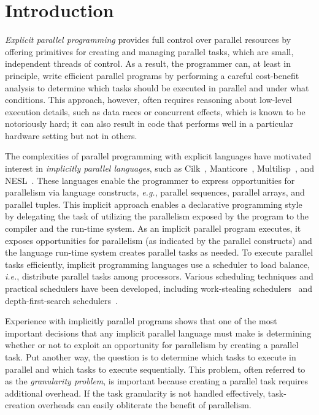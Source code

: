 
\section{Introduction}
\label{sec:introduction}

{\em Explicit parallel programming} provides full control over
parallel resources by offering primitives for creating and managing
parallel tasks, which are small, independent threads of control.   %
As a result, the programmer can, at least in principle, write efficient
parallel programs by performing a careful cost-benefit analysis to
determine which tasks should be executed in parallel and under what
conditions.  This approach, however, often requires reasoning about
low-level execution details, such as data races or concurrent effects,
which is known to be notoriously hard; it can also result in code that
performs well in a particular hardware setting but not in others.

The complexities of parallel programming with explicit languages have
motivated interest in {\em implicitly parallel languages}, such as
Cilk~\cite{Blumofe95},
Manticore~\cite{Fluet:2008:SFG:1411204.1411239,FluetRaReSh11},
Multilisp~\cite{Halstead85}, and NESL~\cite{nesl-implement}.  These
languages enable the programmer to express opportunities for
parallelism via language constructs, \textit{e.g.}, parallel
sequences, parallel arrays, and parallel tuples.  This implicit
approach enables a declarative programming style by delegating the
task of utilizing the parallelism exposed by the program to the
compiler and the run-time system.  As an implicit parallel program
executes, it exposes opportunities for parallelism (as indicated by
the parallel constructs) and the language run-time system creates
parallel tasks as needed.  To execute parallel tasks efficiently,
implicit programming languages use a scheduler to load balance,
\textit{i.e.}, distribute parallel tasks among processors.  Various
scheduling techniques and practical schedulers have been developed,
including work-stealing
schedulers~\cite{BlumofeWorkStealing,AroraBlPl98,AcarBlBl02} and
depth-first-search schedulers~\cite{BlellochGr96}.

Experience with implicitly parallel programs shows that one of the
most important decisions that any implicit parallel language must make
is determining whether or not to exploit an opportunity for
parallelism by creating a parallel task.  Put another way, the
question is to determine which tasks to execute in parallel and which
tasks to execute sequentially.  This problem, often referred to as the
{\em granularity problem}, is important because creating a parallel
task requires additional overhead. If the task granularity is not
handled effectively, task-creation overheads can easily obliterate the
benefit of parallelism.

